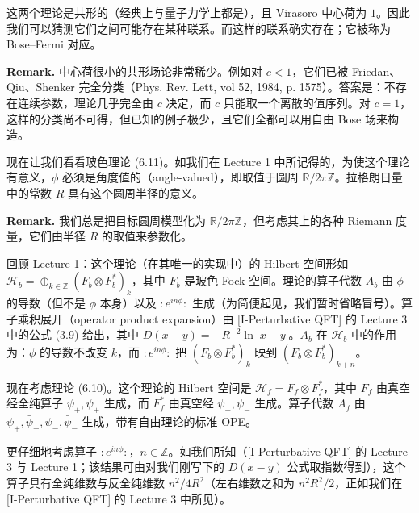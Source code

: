 这两个理论是共形的（经典上与量子力学上都是），且 Virasoro 中心荷为 $1$。因此我们可以猜测它们之间可能存在某种联系。而这样的联系确实存在；它被称为 Bose–Fermi 对应。

\textbf{Remark.} 中心荷很小的共形场论非常稀少。例如对 $c<1$，它们已被 Friedan、Qiu、Shenker 完全分类（Phys. Rev. Lett, vol 52, 1984, p. 1575）。答案是：不存在连续参数，理论几乎完全由 $c$ 决定，而 $c$ 只能取一个离散的值序列。对 $c=1$，这样的分类尚不可得，但已知的例子极少，且它们全都可以用自由 Bose 场来构造。

现在让我们看看玻色理论 (6.11)。如我们在 Lecture 1 中所记得的，为使这个理论有意义，$\phi$ 必须是角度值的（angle-valued），即取值于圆周 $\mathbb{R}/2\pi\mathbb{Z}$。拉格朗日量中的常数 $R$ 具有这个圆周半径的意义。

\textbf{Remark.} 我们总是把目标圆周模型化为 $\mathbb{R}/2\pi\mathbb{Z}$，但考虑其上的各种 Riemann 度量，它们由半径 $R$ 的取值来参数化。

回顾 Lecture 1：这个理论（在其唯一的实现中）的 Hilbert 空间形如 $\mathcal{H}_b=\oplus_{k\in\mathbb{Z}}(F_b\otimes F_b^*)_k$，其中 $F_b$ 是玻色 Fock 空间。理论的算子代数 $A_b$ 由 $\phi$ 的导数（但不是 $\phi$ 本身）以及 $:e^{in\phi}:$ 生成（为简便起见，我们暂时省略冒号）。算子乘积展开（operator product expansion）由 [I-Perturbative QFT] 的 Lecture 3 中的公式 (3.9) 给出，其中 $D(x-y)=-R^{-2}\ln|x-y|$。$A_b$ 在 $\mathcal{H}_b$ 中的作用为：$\phi$ 的导数不改变 $k$，而 $:e^{in\phi}:$ 把 $(F_b\otimes F_b^*)_k$ 映到 $(F_b\otimes F_b^*)_{k+n}$。

现在考虑理论 (6.10)。这个理论的 Hilbert 空间是 $\mathcal{H}_f=F_f\otimes F_f^*$，其中 $F_f$ 由真空经全纯算子 $\psi_+,\bar\psi_+$ 生成，而 $F_f^*$ 由真空经 $\psi_-,\bar\psi_-$ 生成。算子代数 $A_f$ 由 $\psi_+,\bar\psi_+,\psi_-,\bar\psi_-$ 生成，带有自由理论的标准 OPE。

更仔细地考虑算子 $:e^{in\phi}:$，$n\in\mathbb{Z}$。如我们所知（[I-Perturbative QFT] 的 Lecture 3 与 Lecture 1；该结果可由对我们刚写下的 $D(x-y)$ 公式取指数得到），这个算子具有全纯维数与反全纯维数 $n^2/4R^2$（左右维数之和为 $n^2R^2/2$，正如我们在 [I-Perturbative QFT] 的 Lecture 3 中所见）。


